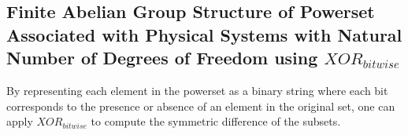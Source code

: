 \documentclass{article}
\begin{document}
%
%
%
%
%
%

\subsection{Finite Abelian Group Structure of Powerset Associated with Physical Systems with Natural Number of Degrees of Freedom using $XOR_{bitwise}$}\label{grouppn}
By representing each element in the powerset as a binary string where each bit corresponds to the presence or absence of an element in the original set, one can apply  $XOR_{bitwise}$  to compute the symmetric difference of the subsets.
\end{document}
